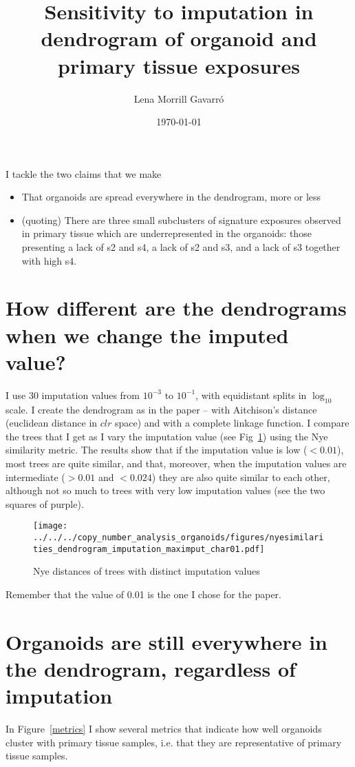 \documentclass[11pt,a4paper,roman]{article}
\begin{document}
\author{Lena Morrill Gavarr\'o}
\title{Sensitivity to imputation in dendrogram of organoid and primary tissue exposures}
\date{\today}


\maketitle


I tackle the two claims that we make 
\begin{itemize}
\item That organoids are spread everywhere in the dendrogram, more or less
\item (quoting) There are three small subclusters of signature exposures observed in primary tissue which are underrepresented in the organoids: those presenting a lack of s2 and s4, a lack of s2 and s3, and a lack of s3 together with high s4. 
\end{itemize}

\section{How different are the dendrograms when we change the imputed value?}
I use 30 imputation values from $10^{-3}$ to $10^{-1}$, with equidistant splits in $\log_{10}$ scale. I create the dendrogram as in the paper -- with Aitchison's distance (euclidean distance in $clr$ space) and with a complete linkage function. I compare the trees that I get as I vary the imputation value (see Fig~\ref{nye}) using the Nye similarity metric. The results show that if the imputation value is low ($<0.01$), most trees are quite similar, and that, moreover, when the imputation values are intermediate ($>0.01$ and $<0.024$) they are also quite similar to each other, although not so much to trees with very low imputation values (see the two squares of purple).

\begin{figure}[h]
\centering
\texttt{[image: ../../../copy\_number\_analysis\_organoids/figures/nyesimilarities\_dendrogram\_imputation\_maximput\_char01.pdf]}
\caption{Nye distances of trees with distinct imputation values\label{nye}}
\end{figure}

Remember that the value of 0.01 is the one I chose for the paper.

\section{Organoids are still everywhere in the dendrogram, regardless of imputation}
In Figure~\ref{metrics} I show several metrics that indicate how well organoids cluster with primary tissue samples, i.e. that they are representative of primary tissue samples. 
\end{document}
